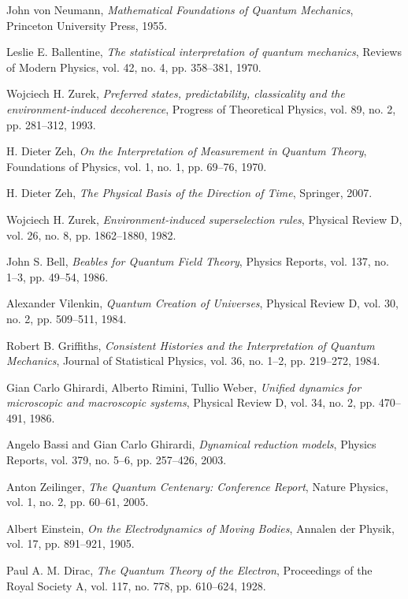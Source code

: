 \documentclass[12pt]{article}
\begin{document}
\begin{thebibliography}{999}
John von Neumann,
\textit{Mathematical Foundations of Quantum Mechanics},
Princeton University Press, 1955.

Leslie E. Ballentine,
\textit{The statistical interpretation of quantum mechanics},
Reviews of Modern Physics, vol. 42, no. 4, pp. 358–381, 1970.

Wojciech H. Zurek,
\textit{Preferred states, predictability, classicality and the environment-induced decoherence},
Progress of Theoretical Physics, vol. 89, no. 2, pp. 281–312, 1993.

H. Dieter Zeh,
\textit{On the Interpretation of Measurement in Quantum Theory},
Foundations of Physics, vol. 1, no. 1, pp. 69–76, 1970.

H. Dieter Zeh,
\textit{The Physical Basis of the Direction of Time},
Springer, 2007.

Wojciech H. Zurek,
\textit{Environment-induced superselection rules},
Physical Review D, vol. 26, no. 8, pp. 1862–1880, 1982.

John S. Bell,
\textit{Beables for Quantum Field Theory},
Physics Reports, vol. 137, no. 1–3, pp. 49–54, 1986.

Alexander Vilenkin,
\textit{Quantum Creation of Universes},
Physical Review D, vol. 30, no. 2, pp. 509–511, 1984.

Robert B. Griffiths,
\textit{Consistent Histories and the Interpretation of Quantum Mechanics},
Journal of Statistical Physics, vol. 36, no. 1–2, pp. 219–272, 1984.

Gian Carlo Ghirardi, Alberto Rimini, Tullio Weber,
\textit{Unified dynamics for microscopic and macroscopic systems},
Physical Review D, vol. 34, no. 2, pp. 470–491, 1986.

Angelo Bassi and Gian Carlo Ghirardi,
\textit{Dynamical reduction models},
Physics Reports, vol. 379, no. 5–6, pp. 257–426, 2003.

Anton Zeilinger,
\textit{The Quantum Centenary: Conference Report},
Nature Physics, vol. 1, no. 2, pp. 60–61, 2005.

Albert Einstein,
\textit{On the Electrodynamics of Moving Bodies},
Annalen der Physik, vol. 17, pp. 891–921, 1905.

Paul A. M. Dirac,
\textit{The Quantum Theory of the Electron},
Proceedings of the Royal Society A, vol. 117, no. 778, pp. 610–624, 1928.


\end{thebibliography}
\end{document}
